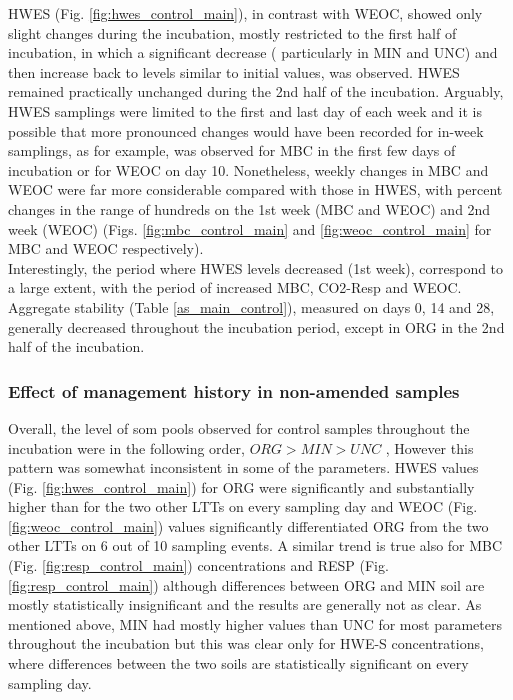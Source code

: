 \documentclass[12pt]{report}
\begin{document}
		\noindent HWES (Fig. \ref{fig:hwes_control_main}), in contrast with WEOC, showed only slight changes during the incubation, mostly restricted to the first half of incubation, in which a significant decrease ( particularly in MIN and UNC) and then increase back to levels similar to initial values, was observed. HWES remained practically unchanged during the 2nd half of the incubation. Arguably, HWES samplings were limited to the first and last day of each week and it is possible that more pronounced changes would have been recorded for in-week samplings, as for example, was observed for MBC in the first few days of incubation or for WEOC on day 10. Nonetheless, weekly changes in MBC and WEOC were far more considerable compared with those in HWES, with percent changes in the range of hundreds on the 1st week (MBC and WEOC) and  2nd week (WEOC) (Figs. \ref{fig:mbc_control_main} and \ref{fig:weoc_control_main} for MBC and WEOC respectively). \\
		Interestingly, the period where HWES levels decreased (1st week), correspond to a large extent, with the period of increased MBC, CO2-Resp and WEOC.\\
		Aggregate stability (Table \ref{as_main_control}), measured on days 0, 14 and 28, generally decreased throughout the incubation period, except in ORG in the 2nd half of the incubation.
		
		
		\subsubsection{Effect of management history in non-amended samples}
		
		Overall, the level of \gls{som} pools observed for control samples throughout the incubation were in the following order, $ ORG  >  MIN  >  UNC $  , However this pattern was somewhat inconsistent in some of the parameters. HWES values (Fig. \ref{fig:hwes_control_main}) for ORG were significantly and substantially higher than for the two other LTTs on every sampling day and WEOC (Fig. \ref{fig:weoc_control_main}) values significantly differentiated ORG from the two other LTTs on 6 out of 10 sampling events. A similar trend is true also for MBC (Fig. \ref{fig:resp_control_main}) concentrations and RESP (Fig. \ref{fig:resp_control_main}) although differences between ORG and MIN soil  are mostly statistically insignificant and the results are generally not as clear. As mentioned above, MIN had mostly higher values than UNC for most parameters throughout the incubation but this was clear only for HWE-S concentrations, where differences between the two soils are statistically significant on every sampling day.
		
\end{document}
